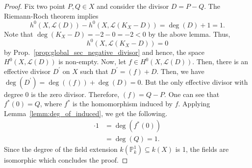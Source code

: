 \begin{proof}
  Fix two point $P,Q\in X$ and consider the divisor $D=P-Q$. The Riemann-Roch
  theorem implies
  \[
    h^{0}(X,\mathcal{L}(D))-h^{0}(X,\mathcal{L}(K_{X}-D))
    =\deg(D)+1=1.
  \]
  Note that $\deg(K_{X}-D)=-2-0=-2<0$ by the above lemma. Thus,
  \[
    h^{0}(X,\mathcal{L}(K_{X}-D))=0
  \]
  by Prop.~\ref{prop:global_sec_negative_divisor} and hence, the space
  $H^{0}(X,\mathcal{L}(D))$ is non-empty. Now, let
  $f\in H^{0}(X,\mathcal{L}(D))$. Then, there is an effective divisor
  $D^{\prime}$ on $X$ such that $D^{\prime}=(f)+D$. Then, we have
  $\deg\left(D^{\prime}\right)=\deg\left((f)\right)+\deg\left(D\right)=0$.
  But the only effective divisor with degree 0 is the zero divisor.
  Therefore, $(f)=Q-P$. One can see that $f^{\ast}(0)=Q$, where
  $f^{\ast}$ is the homomorphism induced by $f$. Applying
  Lemma~\ref{lemm:deg_of_induced}, we get the following.
  \begin{align*}
    [k(X):k(\mathbb{P}^{1})]\cdot 1
    &=\deg\left(f^{\ast}(0)\right) \\
    &=\deg(Q) = 1.
  \end{align*}
  Since the degree of the field extension $k(\mathbb{P}^{1}_{k})
  \subseteq k(X)$ is 1, the fields are isomorphic which
  concludes the proof.
\end{proof}
